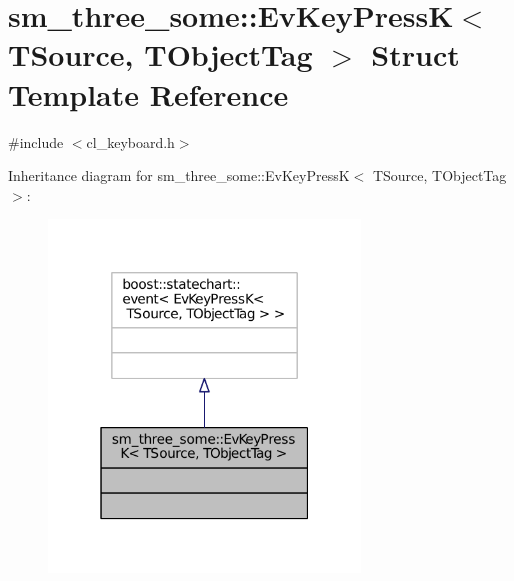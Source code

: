 \hypertarget{structsm__three__some_1_1EvKeyPressK}{}\section{sm\+\_\+three\+\_\+some\+:\+:Ev\+Key\+PressK$<$ T\+Source, T\+Object\+Tag $>$ Struct Template Reference}
\label{structsm__three__some_1_1EvKeyPressK}


{\ttfamily \#include $<$cl\+\_\+keyboard.\+h$>$}



Inheritance diagram for sm\+\_\+three\+\_\+some\+:\+:Ev\+Key\+PressK$<$ T\+Source, T\+Object\+Tag $>$\+:
\nopagebreak
\begin{figure}[H]
\begin{center}
\leavevmode
\includegraphics[width=235pt]{structsm__three__some_1_1EvKeyPressK__inherit__graph}
\end{center}
\end{figure}


